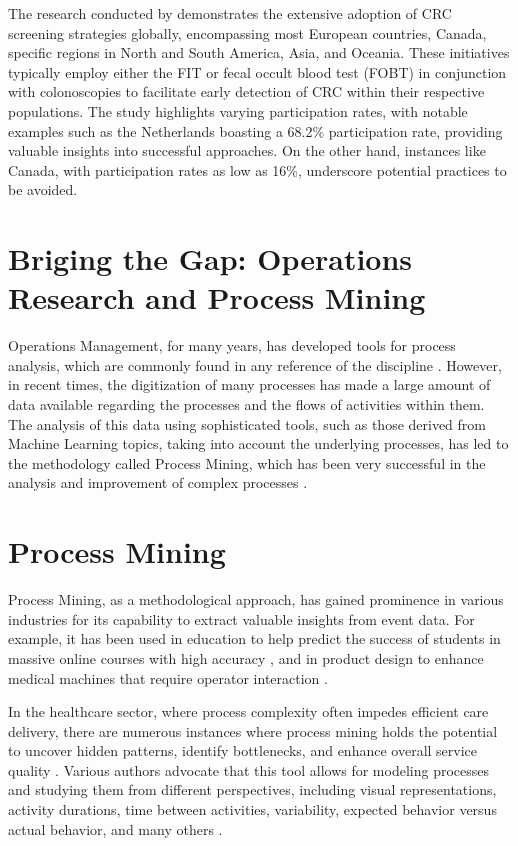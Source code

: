 The research conducted by  demonstrates the extensive adoption of CRC screening strategies globally, encompassing most European countries, Canada, specific regions in North and South America, Asia, and Oceania. These initiatives typically employ either the FIT or fecal occult blood test (FOBT) in conjunction with colonoscopies to facilitate early detection of CRC within their respective populations. The study highlights varying participation rates, with notable examples such as the Netherlands boasting a 68.2\% participation rate, providing valuable insights into successful approaches. On the other hand, instances like Canada, with participation rates as low as 16\%, underscore potential practices to be avoided.

\section{Briging the Gap: Operations Research and Process Mining}

Operations Management, for many years, has developed tools for process analysis, which are commonly found in any reference of the discipline \cite{rama_murthy_operations_2007}. However, in recent times, the digitization of many processes has made a large amount of data available regarding the processes and the flows of activities within them. The analysis of this data using sophisticated tools, such as those derived from Machine Learning topics, taking into account the underlying processes, has led to the methodology called Process Mining, which has been very successful in the analysis and improvement of complex processes \cite{van_der_aalst_process_2004}.

\section{Process Mining}

Process Mining, as a methodological approach, has gained prominence in various industries for its capability to extract valuable insights from event data. For example, it has been used in education to help predict the success of students in massive online courses with high accuracy \cite{umer_predicting_2017}, and in product design to enhance medical machines that require operator interaction \cite{reindler_siemens_2020}.

In the healthcare sector, where process complexity often impedes efficient care delivery, there are numerous instances where process mining holds the potential to uncover hidden patterns, identify bottlenecks, and enhance overall service quality \cite{rojas_process_2016}. Various authors advocate that this tool allows for modeling processes and studying them from different perspectives, including visual representations, activity durations, time between activities, variability, expected behavior versus actual behavior, and many others \cite{bozkaya_process_2009}.

